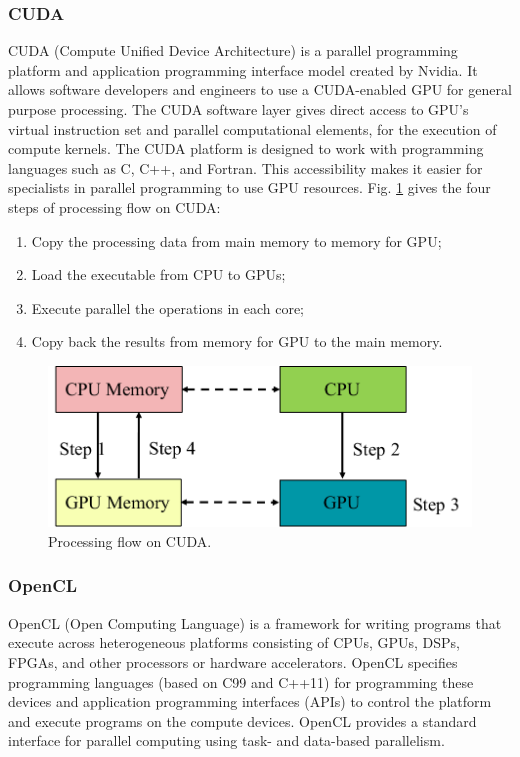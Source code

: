 \subsubsection{CUDA}

CUDA (Compute Unified Device Architecture) \cite{nvidia2011nvidia} is a parallel programming platform and application programming interface model created by Nvidia. It allows software developers and engineers to use a CUDA-enabled GPU for general purpose processing. The CUDA software layer gives direct access to GPU's virtual instruction set and parallel computational elements, for the execution of compute kernels. The CUDA platform is designed to work with programming languages such as C, C++, and Fortran. This accessibility makes it easier for specialists in parallel programming to use GPU resources. Fig. \ref{cuda_flow} gives the four steps of processing flow on CUDA:

\begin{enumerate}
	\item Copy the processing data from main memory to memory for GPU;
	\item Load the executable from CPU to GPUs;
	\item Execute parallel the operations in each core;
	\item Copy back the results from memory for GPU to the main memory.
\end{enumerate}

\begin{figure}[htbp]
	\centering
	\includegraphics[width=0.72\linewidth]{fig/CUDA.pdf}
	\caption{Processing flow on CUDA.}
	\label{cuda_flow}
\end{figure}

\subsubsection{OpenCL}

OpenCL (Open Computing Language) \cite{munshi2009opencl} is a framework for writing programs that execute across heterogeneous platforms consisting of CPUs, GPUs, DSPs, FPGAs, and other processors or hardware accelerators. OpenCL specifies programming languages (based on C99 and C++11) for programming these devices and application programming interfaces (APIs) to control the platform and execute programs on the compute devices. OpenCL provides a standard interface for parallel computing using task- and data-based parallelism.


